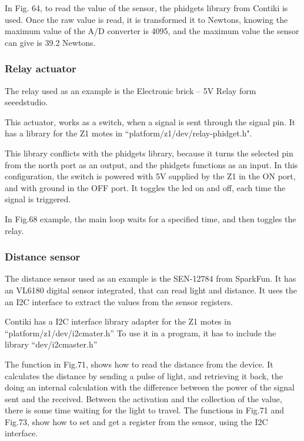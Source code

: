 In Fig. 64,
	to read the value of the sensor,
	the phidgets library from Contiki is used.
Once the raw value is read,
	it is transformed it to Newtons,
	knowing the maximum value of the A/D converter is 4095,
	and the maximum value the sensor can give is 39.2 Newtons.

\subsubsection{Relay actuator}
The relay used as an example is the Electronic brick – 5V Relay form seeedstudio.

This actuator,
	works as a switch,
	when a signal is sent through the signal pin.
It has a library for the Z1 motes in “platform/z1/dev/relay-phidget.h".

This library conflicts with the phidgets library,
	because it turns the selected pin from the north port as an output,
	and the phidgets functions as an input.
In this configuration,
	the switch is powered with 5V supplied by the Z1 in the ON port,
	and with ground in the OFF port.
It toggles the led on and off,
	each time the signal is triggered.

In Fig.68 example,
	the main loop waits for a specified time,
	and then toggles the relay.

\subsubsection{Distance sensor}
The distance sensor used as an example is the SEN-12784 from SparkFun.
It has an VL6180 digital sensor integrated,
	that can read light and distance.
It uses the an I2C interface to extract the values from the sensor registers.

Contiki has a I2C interface library adapter for the Z1 motes in “platform/z1/dev/i2cmater.h” To use it in a program,
	it has to include the library “dev/i2cmaster.h”

The function in Fig.71,
	shows how to read the distance from the device.
It calculates the distance by sending a pulse of light,
	and retrieving it back,
	the doing an internal calculation with the difference between the power of the signal sent and the received.
Between the activation and the collection of the value,
	there is some time waiting for the light to travel.
The functions in Fig.71 and Fig.73,
	show how to set and get a register from the sensor,
	using the I2C interface.





























